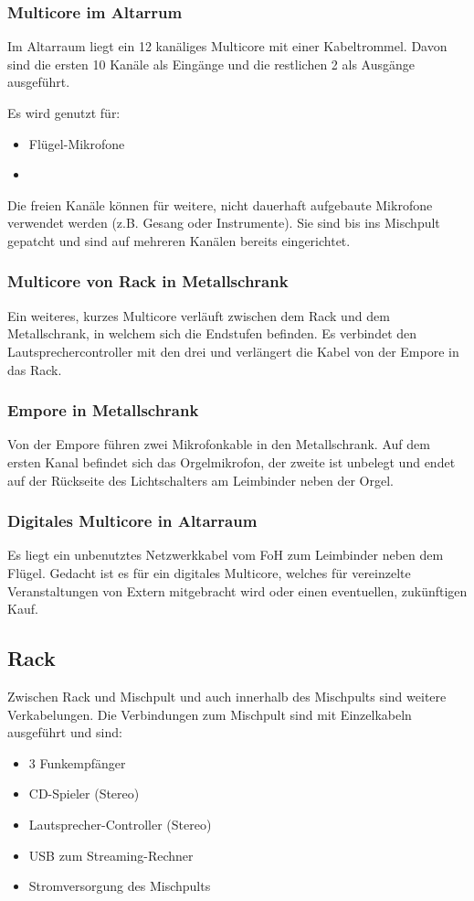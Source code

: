 			\subsubsection{Multicore im Altarrum}\label{kabel:ton:multicore_altarraum}
				Im Altarraum liegt ein 12 kanäliges Multicore mit einer Kabeltrommel.
				Davon sind die ersten 10 Kanäle als Eingänge und die restlichen 2 als Ausgänge ausgeführt.

				Es wird genutzt für:
				\begin{itemize}
					\item Flügel-Mikrofone
					\item {}
				\end{itemize}

				Die freien Kanäle können für weitere, nicht dauerhaft aufgebaute Mikrofone verwendet werden (z.B. Gesang oder Instrumente).
				Sie sind bis ins Mischpult gepatcht und sind auf mehreren Kanälen bereits eingerichtet.
			\subsubsection{Multicore von Rack in Metallschrank}
				Ein weiteres, kurzes Multicore verläuft zwischen dem Rack und dem Metallschrank, in welchem sich die Endstufen befinden.
				Es verbindet den \Gls{Lautsprechercontroller} mit den drei  und verlängert die Kabel von der Empore in das Rack.
			\subsubsection{Empore in Metallschrank}
				Von der Empore führen zwei Mikrofonkable in den Metallschrank.
				Auf dem ersten Kanal befindet sich das Orgelmikrofon, der zweite ist unbelegt und endet auf der Rückseite des Lichtschalters am Leimbinder neben der Orgel.
			\subsubsection{Digitales Multicore in Altarraum}\label{kabel:ton:digitales_multicore}
				Es liegt ein unbenutztes Netzwerkkabel vom \Gls{FoH} zum Leimbinder neben dem Flügel.
				Gedacht ist es für ein \Gls{digitales Multicore}, welches für vereinzelte Veranstaltungen von Extern mitgebracht wird oder einen eventuellen, zukünftigen Kauf.
		\subsection{Rack}
				Zwischen Rack und Mischpult und auch innerhalb des Mischpults sind weitere Verkabelungen.
				Die Verbindungen zum Mischpult sind mit Einzelkabeln ausgeführt und sind:
				\begin{itemize}
					\item 3 Funkempfänger
					\item CD-Spieler (Stereo)
					\item Lautsprecher-Controller (Stereo)
					\item USB zum Streaming-Rechner
					\item Stromversorgung des Mischpults
				\end{itemize}
